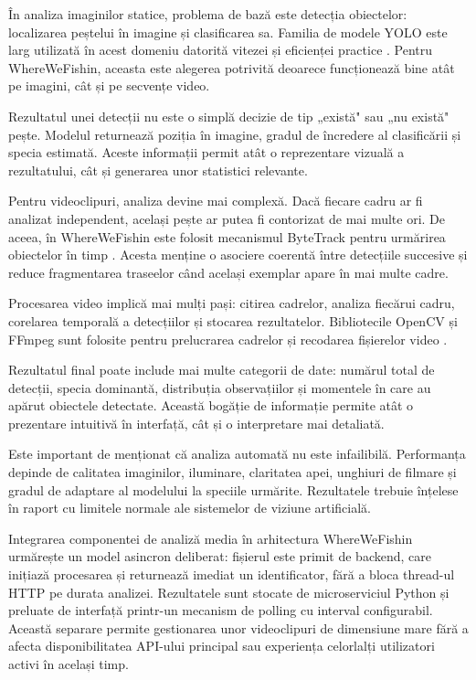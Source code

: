 În analiza imaginilor statice, problema de bază este detecția obiectelor: localizarea peștelui în imagine și clasificarea sa. Familia de modele YOLO este larg utilizată în acest domeniu datorită vitezei și eficienței practice \citep{ultralytics,redmon2016yolo}. Pentru WhereWeFishin, aceasta este alegerea potrivită deoarece funcționează bine atât pe imagini, cât și pe secvențe video.

Rezultatul unei detecții nu este o simplă decizie de tip „există" sau „nu există" pește. Modelul returnează poziția în imagine, gradul de încredere al clasificării și specia estimată. Aceste informații permit atât o reprezentare vizuală a rezultatului, cât și generarea unor statistici relevante.

Pentru videoclipuri, analiza devine mai complexă. Dacă fiecare cadru ar fi analizat independent, același pește ar putea fi contorizat de mai multe ori. De aceea, în WhereWeFishin este folosit mecanismul ByteTrack pentru urmărirea obiectelor în timp \citep{zhang2022bytetrack}. Acesta menține o asociere coerentă între detecțiile succesive și reduce fragmentarea traseelor când același exemplar apare în mai multe cadre.

Procesarea video implică mai mulți pași: citirea cadrelor, analiza fiecărui cadru, corelarea temporală a detecțiilor și stocarea rezultatelor. Bibliotecile OpenCV și FFmpeg sunt folosite pentru prelucrarea cadrelor și recodarea fișierelor video \citep{opencv,ffmpeg}.

Rezultatul final poate include mai multe categorii de date: numărul total de detecții, specia dominantă, distribuția observațiilor și momentele în care au apărut obiectele detectate. Această bogăție de informație permite atât o prezentare intuitivă în interfață, cât și o interpretare mai detaliată.

Este important de menționat că analiza automată nu este infailibilă. Performanța depinde de calitatea imaginilor, iluminare, claritatea apei, unghiuri de filmare și gradul de adaptare al modelului la speciile urmărite. Rezultatele trebuie înțelese în raport cu limitele normale ale sistemelor de viziune artificială.

Integrarea componentei de analiză media în arhitectura WhereWeFishin urmărește un model asincron deliberat: fișierul este primit de backend, care inițiază procesarea și returnează imediat un identificator, fără a bloca thread-ul HTTP pe durata analizei. Rezultatele sunt stocate de microserviciul Python și preluate de interfață printr-un mecanism de polling cu interval configurabil. Această separare permite gestionarea unor videoclipuri de dimensiune mare fără a afecta disponibilitatea API-ului principal sau experiența celorlalți utilizatori activi în același timp.

